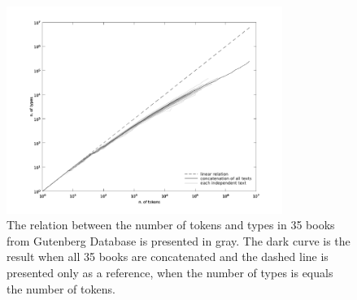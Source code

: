 \begin{figure}[htbp]
\centering
\includegraphics[width=0.8\textwidth]{images/heapslawtexts.png}
\caption{The relation between the number of tokens and types in 35 books from Gutenberg Database is presented in gray. The dark curve is the result when all 35 books are concatenated and the dashed line is presented only as a reference, when the number of types is equals the number of tokens.}
\label{fig:heapslawtexts}
\end{figure}





